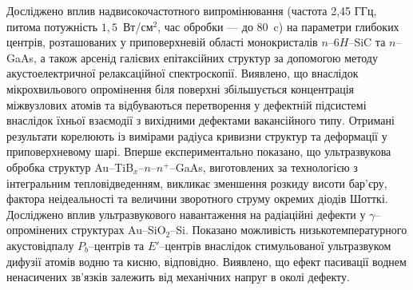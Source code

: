  Досліджено вплив надвисокочастотного випромінювання (частота 2,45 ГГц, питома потужність  $1,5$~Вт/см$^2$, час обробки --- до 80~c) на параметри глибоких центрів, розташованих у приповерхневій області монокристалів $n$--6$H$--SiC та $n$--GaAs, а також арсенід галієвих епітаксійних структур за допомогою методу акустоелектричної релаксаційної спектроскопії.
Виявлено, що внаслідок мікрохвильового опромінення біля поверхні збільшується концентрація міжвузлових атомів та відбуваються перетворення у дефектній підсистемі внаслідок їхньої взаємодії з вихідними дефектами вакансійного типу.
Отримані результати корелюють із вимірами радіуса кривизни структур та деформації у приповерхневому шарі.
Вперше експериментально показано, що ультразвукова обробка структур
Au--TiB$_x$--$n$--$n^+$--GaAs, виготовлених
за технологією з інтегральним тепловідведенням, викликає зменшення розкиду висоти бар'єру, фактора неідеальності та величини зворотного струму окремих діодів Шотткі.
Досліджено вплив ультразвукового навантаження
на радіаційні дефекти у $\gamma$--опромінених структурах Au--SiO$_2$--Si.
Показано можливість низькотемпературного акустовідпалу $P_b$--центрів
та $E'$--центрів
внаслідок стимульованої ультразвуком дифузії атомів водню та кисню, відповідно.
Виявлено, що ефект  пасивації воднем ненасичених зв'язків залежить
від механічних напруг в околі дефекту.





\vspace{0.7cm}
\noindent
\keywords

\vspace{2cm}




